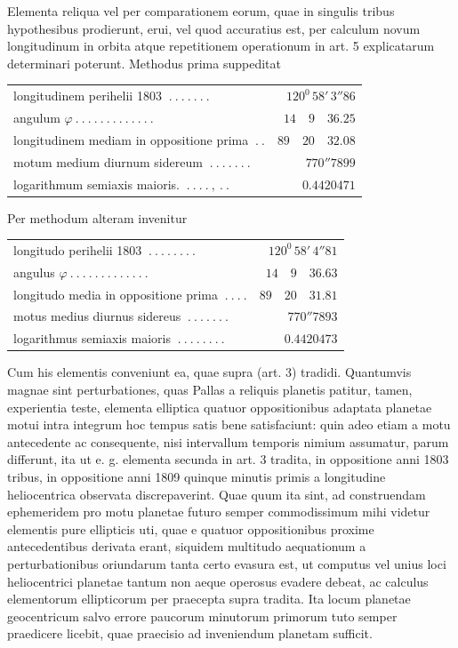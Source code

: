 Elementa reliqua vel per comparationem eorum, quae in singulis tribus hypothesibus prodierunt, erui, vel quod accuratius est, per calculum novum longitudinum in orbita atque repetitionem operationum in art. 5 explicatarum determinari poterunt. Methodus prima suppeditat
\begin{center}\fontsize{9}{11}\selectfont\setlength{\tabcolsep}{3pt}\begin{tabular}{lr}
longitudinem perihelii 1803 $\ .\ .\ .\ .\ .\ .\ .$&$120^0\,58'\,3''86$\\
angulum $\varphi\ .\ .\ .\ .\ .\ .\ .\ .\ .\ .\ .\ .\ .$&$14\quad9\quad36.25$\\
longitudinem mediam in oppositione prima $\ .\ .$&$89\quad20\quad32.08$\\
motum medium diurnum sidereum $\ .\ .\ .\ .\ .\ .\ .$&$770''7899$\\
logarithmum semiaxis maioris. $\ .\ .\ .\ .\ ,\ .\ .$&$0.4420471$
\end{tabular}\end{center}
Per methodum alteram invenitur
\begin{center}\fontsize{9}{11}\selectfont\setlength{\tabcolsep}{3pt}\begin{tabular}{lr}
longitudo perihelii 1803 $\ .\ .\ .\ .\ .\ .\ .\ .$&$120^0\,58'\,4''81$\\
angulus $\varphi\ .\ .\ .\ .\ .\ .\ .\ .\ .\ .\ .\ .\ .$&$14\quad9\quad36.63$\\
longitudo media in oppositione prima $\ .\ .\ .\ .$&$89\quad20\quad31.81$\\
motus medius diurnus sidereus $\ .\ .\ .\ .\ .\ .\ .$&$770''7893$\\
logarithmus semiaxis maioris $\ .\ .\ .\ .\ .\ .\ .\ .$&$0.4420473$
\end{tabular}\end{center}
Cum his elementis conveniunt ea, quae supra (art. 3) tradidi.
Quantumvis magnae sint perturbationes, quas Pallas a reliquis planetis patitur, tamen, experientia teste, elementa elliptica quatuor oppositionibus adaptata planetae motui intra integrum hoc tempus satis bene satisfaciunt: quin adeo etiam a motu antecedente ac consequente, nisi intervallum temporis nimium assumatur, parum differunt, ita ut e. g. elementa secunda in art. 3 tradita, in oppositione anni 1803 tribus, in oppositione anni 1809 quinque minutis primis a longitudine heliocentrica observata discrepaverint. Quae quum ita sint, ad construendam ephemeridem pro motu planetae futuro semper commodissimum mihi videtur elementis pure ellipticis uti, quae e quatuor oppositionibus proxime antecedentibus derivata erant, siquidem multitudo aequationum a perturbationibus oriundarum tanta certo evasura est, ut computus vel unius loci heliocentrici planetae tantum non aeque operosus evadere debeat, ac calculus elementorum ellipticorum per praecepta supra tradita. Ita locum planetae geocentricum salvo errore paucorum minutorum primorum tuto semper praedicere licebit, quae praecisio ad inveniendum planetam sufficit.
